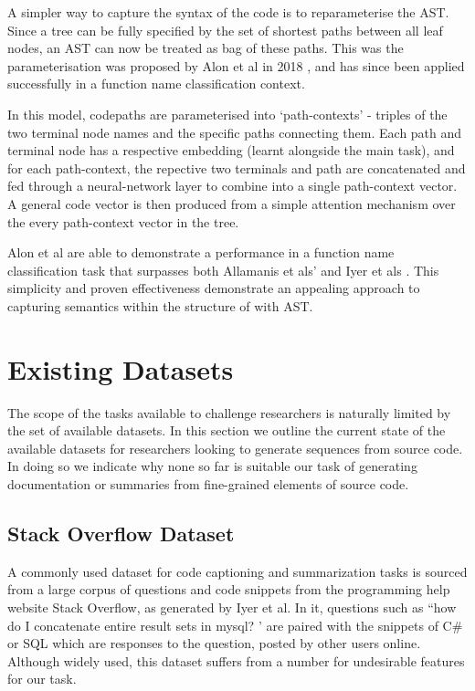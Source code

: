 A simpler way to capture the syntax of the code is to reparameterise the AST.
Since a tree can be fully specified by the set of shortest paths between all leaf nodes, an AST can now be treated as bag of these paths. This was the parameterisation was proposed by Alon et al in 2018 \cite{alon_general_2018}, and has since been applied successfully in a function name classification context\cite{alon_code2vec_2018}.

In this model, codepaths are parameterised into `path-contexts' - triples of the two terminal node names and the specific paths connecting them.
Each path and terminal node has a respective embedding (learnt alongside the main task), and for each path-context, the repective two terminals and path are concatenated and fed through a neural-network layer to combine into a single path-context vector.
A general code vector is then produced from a simple attention mechanism over the every path-context vector in the tree. 


Alon et al are able to demonstrate a performance in a function name classification task that surpasses both Allamanis et als' \cite{allamanis_convolutional_2016} and Iyer et als \cite{iyer_summarizing_2016}. This simplicity and proven effectiveness demonstrate an appealing approach to capturing semantics within the structure of with AST.

\section{Existing Datasets}
\label{sec:existing_datasets}

The scope of the tasks available to challenge researchers is naturally limited by the set of available datasets.
In this section we outline the current state of the available datasets for researchers looking to generate sequences from source code. In doing so we indicate why none so far is suitable our task of generating documentation or summaries from fine-grained elements of source code.

\subsection{Stack Overflow Dataset}

A commonly used dataset for code captioning and summarization tasks is sourced from a large corpus of questions and code snippets from the programming help website Stack Overflow, as generated by Iyer et al\cite{iyer_summarizing_2016}. In it, questions such as ``how do I concatenate entire result sets in mysql? ' are paired with the snippets of C\# or SQL which are responses to the question, posted by other users online.
Although widely used, this dataset suffers from a number for undesirable features for our task. 

